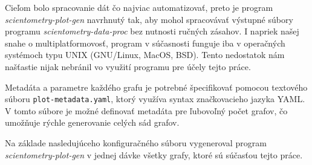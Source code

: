 Cieľom bolo spracovanie dát čo najviac automatizovať, preto je program
\emph{scientometry-plot-gen} navrhnutý tak, aby mohol spracovávať výstupné
súbory programu \emph{scientometry-data-proc} bez nutnosti ručných zásahov.  I
napriek našej snahe o multiplatformovosť, program v súčasnosti funguje iba v
operačných systémoch typu UNIX (GNU/Linux, MacOS, BSD). Tento nedostatok nám
našťastie nijak nebránil vo využití programu pre účely tejto práce.

Metadáta a parametre každého grafu je potrebné špecifikovať pomocou textového
súboru \verb|plot-metadata.yaml|, ktorý využíva syntax značkovacieho jazyka
YAML. V tomto súbore je možné definovať metadáta pre ľubovoľný počet
grafov, čo umožňuje rýchle generovanie celých sád grafov.

Na základe nasledujúceho konfiguračného súboru vygeneroval
program \emph{scientometry-plot-gen} v jednej dávke všetky grafy, ktoré sú
súčasťou tejto práce.

